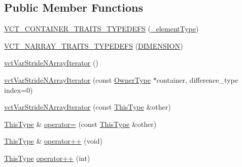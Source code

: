 \subsection*{Public Member Functions}
\begin{DoxyCompactItemize}
\item 
\hyperlink{classvct_var_stride_n_array_iterator_ad5e114d1d3da325f97d3d7efc39404bf}{V\-C\-T\-\_\-\-C\-O\-N\-T\-A\-I\-N\-E\-R\-\_\-\-T\-R\-A\-I\-T\-S\-\_\-\-T\-Y\-P\-E\-D\-E\-F\-S} (\hyperlink{classvct_var_stride_n_array_const_iterator_adb02654cc147e6ce3ceef03ebe78c4e2}{\-\_\-element\-Type})
\item 
\hyperlink{classvct_var_stride_n_array_iterator_aaad1ecdc19f3ad0afffbaf40bf30f3d4}{V\-C\-T\-\_\-\-N\-A\-R\-R\-A\-Y\-\_\-\-T\-R\-A\-I\-T\-S\-\_\-\-T\-Y\-P\-E\-D\-E\-F\-S} (\hyperlink{classvct_var_stride_n_array_iterator_a982bcef37bef37c57993bcf62f572b53ada81b91fee86d82f21804a797bc37cdb}{D\-I\-M\-E\-N\-S\-I\-O\-N})
\item 
\hyperlink{classvct_var_stride_n_array_iterator_a0b0e30edc9d10483327a9eb38df14fad}{vct\-Var\-Stride\-N\-Array\-Iterator} ()
\item 
\hyperlink{classvct_var_stride_n_array_iterator_a34d40e5244854d85a735ac0b304e5275}{vct\-Var\-Stride\-N\-Array\-Iterator} (const \hyperlink{classvct_var_stride_n_array_const_iterator_ac75d53a8defeee467ba9ebe2962e29ac}{Owner\-Type} $\ast$container, difference\-\_\-type index=0)
\item 
\hyperlink{classvct_var_stride_n_array_iterator_ae78e2919cf40d4076107177a2536993b}{vct\-Var\-Stride\-N\-Array\-Iterator} (const \hyperlink{classvct_var_stride_n_array_const_iterator_ac729d2af265785aad6fdd43a70fbffdb}{This\-Type} \&other)
\item 
\hyperlink{classvct_var_stride_n_array_const_iterator_ac729d2af265785aad6fdd43a70fbffdb}{This\-Type} \& \hyperlink{classvct_var_stride_n_array_iterator_a947f9b8c6b4bd2d62df50a2b55ddea74}{operator=} (const \hyperlink{classvct_var_stride_n_array_const_iterator_ac729d2af265785aad6fdd43a70fbffdb}{This\-Type} \&other)
\item 
\hyperlink{classvct_var_stride_n_array_const_iterator_ac729d2af265785aad6fdd43a70fbffdb}{This\-Type} \& \hyperlink{classvct_var_stride_n_array_iterator_ae9fba3f494b57cac90808f70244eefea}{operator++} (void)
\item 
\hyperlink{classvct_var_stride_n_array_const_iterator_ac729d2af265785aad6fdd43a70fbffdb}{This\-Type} \hyperlink{classvct_var_stride_n_array_iterator_aaec75b6343eb41a93213fea79dc51dd3}{operator++} (int)

\end{DoxyCompactItemize}
